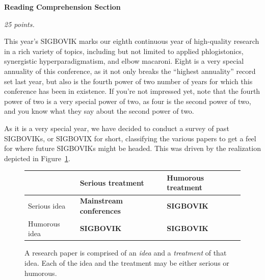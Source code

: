 \documentclass[12pt]{article}
\begin{document}
{\large \bf \sffamily Reading Comprehension Section}

{\em 25 points.}

This year's SIGBOVIK marks our eighth continuous year of high-quality research in a rich variety of topics, including but not limited to applied phlogistonics, synergistic hyperparadigmatism, and elbow macaroni. Eight is a very special annuality of this conference, as it not only breaks the ``highest annuality'' record set last year, but also is the fourth power of two number of years for which this conference has been in existence. If you're not impressed yet, note that the fourth power of two is a very special power of two, as four is the second power of two, and you know what they say about the second power of two.

As it is a very special year, we have decided to conduct a survey of past SIGBOVIKs, or SIGBOVIX for short, classifying the various papers to get a feel for where future SIGBOVIKs might be headed. This was driven by the realization depicted in Figure~\ref{fig:table}.

\begin{figure}[h]
\begin{center}
\begin{tabular}{p{5em}|p{5em}|p{5em}|}
& Serious treatment & Humorous treatment \\
\hline
Serious idea & \bf Mainstream conferences & \bf SIGBOVIK \\
\hline
Humorous idea & \bf SIGBOVIK & \bf SIGBOVIK \\
\hline

\end{tabular}
\end{center}
\caption{A research paper is comprised of an {\em idea} and a {\em treatment} of that idea. Each of the idea and the treatment may be either serious or humorous.}
\label{fig:table}
\end{figure}
\end{document}
